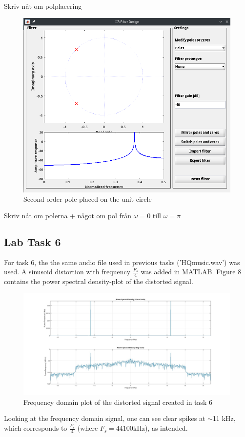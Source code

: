 \documentclass[a4paper,11pt]{article}
\begin{document}
Skriv nåt om polplacering
\begin{figure}[H]
    \centering
    \includegraphics[scale=0.6]{./images/2ndorder-pole.png}
    \caption{Second order pole placed on the unit circle}
    \label{fig:my_label}
\end{figure}
Skriv nåt om polerna + något om pol från $\omega = 0$ till $\omega = \pi$
\subsection{Lab Task 6}
For task 6, the the same audio file used in previous tasks ('HQmusic.wav') was used. A sinusoid distortion with frequency $\frac{F_s}{4}$ was added in MATLAB. Figure 8 contains the power spectral density-plot of the distorted signal.
\begin{figure}[H]
    \hspace{-50pt}\includegraphics[scale=0.28]{./images/Task6-FFT.jpg}
    \caption{Frequency domain plot of the distorted signal created in task 6}
    \label{fig:my_label}
\end{figure}
Looking at the frequency domain signal, one can see clear spikes at $\sim$11 kHz, which corresponds to $\frac{F_s}{4}$ (where $F_s = 44100$kHz), as intended.
\end{document}
